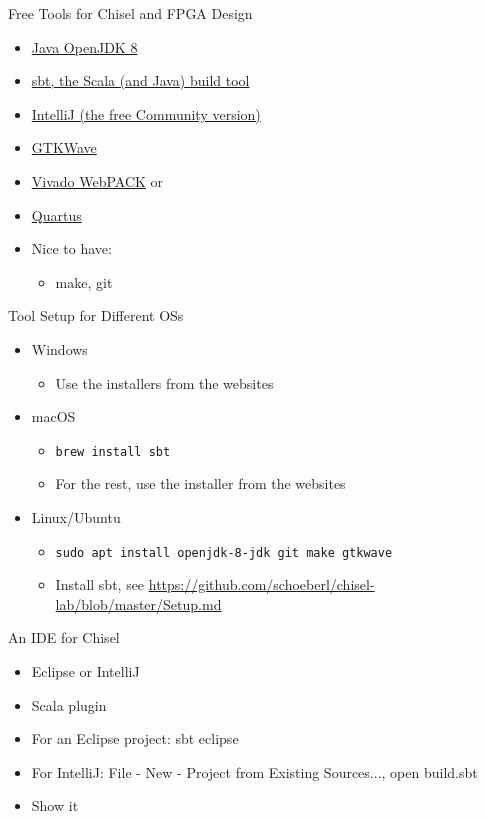 \documentclass[xcolor=pdflatex,dvipsnames,table]{beamer}
\newcommand{\code}[1]{{\texttt{#1}}}
\begin{document}
\begin{frame}[fragile]{Free Tools for Chisel and FPGA Design}
\begin{itemize}
\item \href{https://adoptopenjdk.net/}{Java OpenJDK 8}
\item \href{https://www.scala-sbt.org/}{sbt, the Scala (and Java) build tool}
\item \href{https://www.jetbrains.com/idea/download/}{IntelliJ (the free Community version)}
\item \href{http://gtkwave.sourceforge.net/}{GTKWave}
\item \href{https://www.xilinx.com/products/design-tools/vivado/vivado-webpack.html}{Vivado WebPACK} or
\item \href{http://www.altera.com/products/software/quartus-ii/web-edition/qts-we-index.html}{Quartus}
\item Nice to have:
\begin{itemize}
\item make, git
\end{itemize}
\end{itemize}
\end{frame}

\begin{frame}[fragile]{Tool Setup for Different OSs}
\begin{itemize}
\item Windows
\begin{itemize}
\item Use the installers from the websites
\end{itemize}
\item macOS
\begin{itemize}
\item \code{brew install sbt}
\item For the rest, use the installer from the websites
\end{itemize}
\item Linux/Ubuntu
\begin{itemize}
\item \code{sudo apt install openjdk-8-jdk git make gtkwave}
\item Install sbt, see \url{https://github.com/schoeberl/chisel-lab/blob/master/Setup.md}
\end{itemize}
\end{itemize}
\end{frame}

\begin{frame}[fragile]{An IDE for Chisel}
\begin{itemize}
\item Eclipse or IntelliJ
\item Scala plugin
\item For an Eclipse project: sbt eclipse
\item For IntelliJ: File - New - Project from Existing Sources..., open build.sbt
\item Show it
\end{itemize}
\end{frame}
\end{document}
